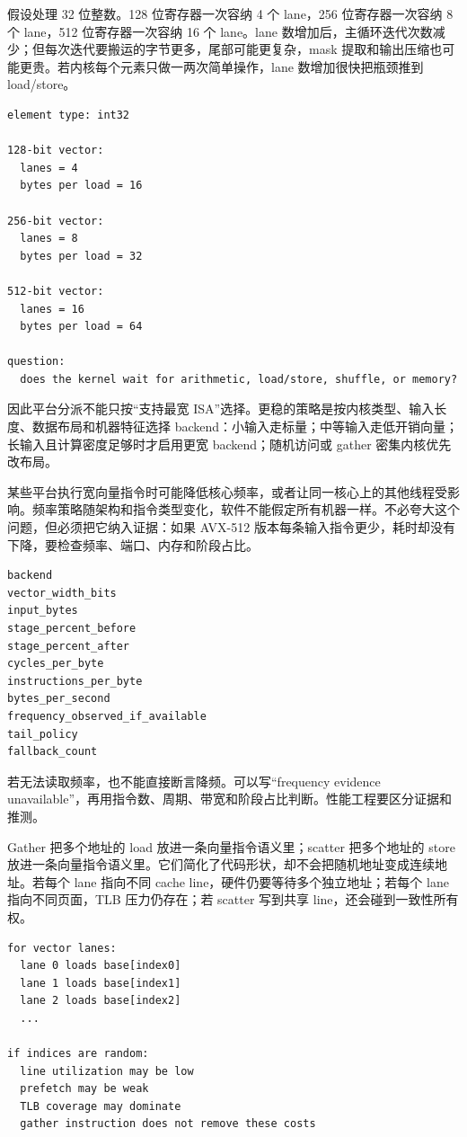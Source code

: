 假设处理 32 位整数。128 位寄存器一次容纳 4 个 lane，256 位寄存器一次容纳 8 个 lane，512 位寄存器一次容纳 16 个 lane。lane 数增加后，主循环迭代次数减少；但每次迭代要搬运的字节更多，尾部可能更复杂，mask 提取和输出压缩也可能更贵。若内核每个元素只做一两次简单操作，lane 数增加很快把瓶颈推到 load/store。

\begin{lstlisting}[numbers=none,caption={向量宽度推导的第一张账本}]
element type: int32

128-bit vector:
  lanes = 4
  bytes per load = 16

256-bit vector:
  lanes = 8
  bytes per load = 32

512-bit vector:
  lanes = 16
  bytes per load = 64

question:
  does the kernel wait for arithmetic, load/store, shuffle, or memory?
\end{lstlisting}

因此平台分派不能只按“支持最宽 ISA”选择。更稳的策略是按内核类型、输入长度、数据布局和机器特征选择 backend：小输入走标量；中等输入走低开销向量；长输入且计算密度足够时才启用更宽 backend；随机访问或 gather 密集内核优先改布局。

某些平台执行宽向量指令时可能降低核心频率，或者让同一核心上的其他线程受影响。频率策略随架构和指令类型变化，软件不能假定所有机器一样。不必夸大这个问题，但必须把它纳入证据：如果 AVX-512 版本每条输入指令更少，耗时却没有下降，要检查频率、端口、内存和阶段占比。

\begin{lstlisting}[numbers=none,caption={宽向量收益审计字段}]
backend
vector_width_bits
input_bytes
stage_percent_before
stage_percent_after
cycles_per_byte
instructions_per_byte
bytes_per_second
frequency_observed_if_available
tail_policy
fallback_count
\end{lstlisting}

若无法读取频率，也不能直接断言降频。可以写“frequency evidence unavailable”，再用指令数、周期、带宽和阶段占比判断。性能工程要区分证据和推测。

Gather 把多个地址的 load 放进一条向量指令语义里；scatter 把多个地址的 store 放进一条向量指令语义里。它们简化了代码形状，却不会把随机地址变成连续地址。若每个 lane 指向不同 cache line，硬件仍要等待多个独立地址；若每个 lane 指向不同页面，TLB 压力仍存在；若 scatter 写到共享 line，还会碰到一致性所有权。

\begin{lstlisting}[numbers=none,caption={gather 账本必须回到地址序列}]
for vector lanes:
  lane 0 loads base[index0]
  lane 1 loads base[index1]
  lane 2 loads base[index2]
  ...

if indices are random:
  line utilization may be low
  prefetch may be weak
  TLB coverage may dominate
  gather instruction does not remove these costs
\end{lstlisting}

